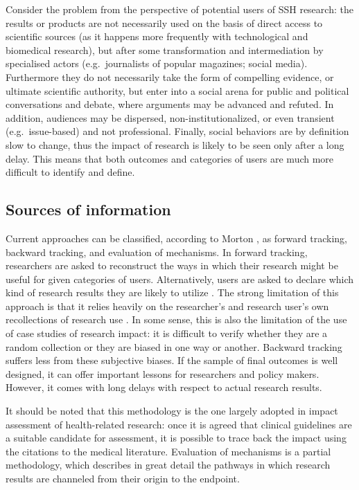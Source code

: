 \documentclass[]{book}
\begin{document}
Consider the problem from the perspective of potential users of SSH
research: the results or products are not necessarily used on the basis
of direct access to scientific sources (as it happens more frequently
with technological and biomedical research), but after some
transformation and intermediation by specialised actors
(e.g.~journalists of popular magazines; social media). Furthermore they
do not necessarily take the form of compelling evidence, or ultimate
scientific authority, but enter into a social arena for public and
political conversations and debate, where arguments may be advanced and
refuted. In addition, audiences may be dispersed, non-institutionalized,
or even transient (e.g.~issue-based) and not professional. Finally,
social behaviors are by definition slow to change, thus the impact of
research is likely to be seen only after a long delay. This means that
both outcomes and categories of users are much more difficult to
identify and define.

\subsection{Sources of information}\label{sources-of-information}

Current approaches can be classified, according to Morton
\citep{morton2015progressing}, as forward tracking, backward tracking,
and evaluation of mechanisms. In forward tracking, researchers are asked
to reconstruct the ways in which their research might be useful for
given categories of users. Alternatively, users are asked to declare
which kind of research results they are likely to utilize
\citep{tang2000pilot}. The strong limitation of this approach is that it
relies heavily on the researcher's and research user's own recollections
of research use \citep[\citet{donovan2011state}]{nutley2007using}. In
some sense, this is also the limitation of the use of case studies of
research impact: it is difficult to verify whether they are a random
collection or they are biased in one way or another. Backward tracking
suffers less from these subjective biases. If the sample of final
outcomes is well designed, it can offer important lessons for
researchers and policy makers. However, it comes with long delays with
respect to actual research results.

It should be noted that this methodology is the one largely adopted in
impact assessment of health-related research: once it is agreed that
clinical guidelines are a suitable candidate for assessment, it is
possible to trace back the impact using the citations to the medical
literature. Evaluation of mechanisms is a partial methodology, which
describes in great detail the pathways in which research results are
channeled from their origin to the endpoint.
\end{document}
